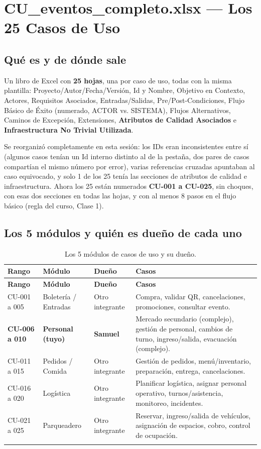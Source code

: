 \documentclass[12pt,a4paper]{article}
\begin{document}
\section{CU\_eventos\_completo.xlsx --- Los 25 Casos de Uso}

\subsection{Qué es y de dónde sale}

Un libro de Excel con \textbf{25 hojas}, una por caso de uso, todas con la misma plantilla:
Proyecto/Autor/Fecha/Versión, Id y Nombre, Objetivo en Contexto, Actores, Requisitos Asociados,
Entradas/Salidas, Pre/Post-Condiciones, Flujo Básico de Éxito (numerado, ACTOR vs. SISTEMA),
Flujos Alternativos, Caminos de Excepción, Extensiones, \textbf{Atributos de Calidad Asociados} e
\textbf{Infraestructura No Trivial Utilizada}.

Se reorganizó completamente en esta sesión: los IDs eran inconsistentes entre sí (algunos casos
tenían un Id interno distinto al de la pestaña, dos pares de casos compartían el mismo número por
error), varias referencias cruzadas apuntaban al caso equivocado, y solo 1 de los 25 tenía las
secciones de atributos de calidad e infraestructura. Ahora los 25 están numerados
\textbf{CU-001 a CU-025}, sin choques, con esas dos secciones en todas las hojas, y con al menos 8
pasos en el flujo básico (regla del curso, Clase 1).

\subsection{Los 5 módulos y quién es dueño de cada uno}

\begin{longtable}{p{1.7cm}p{4.2cm}p{2.6cm}p{4.4cm}}
\toprule
\textbf{Rango} & \textbf{Módulo} & \textbf{Dueño} & \textbf{Casos}\\
\midrule
\endfirsthead
\toprule
\textbf{Rango} & \textbf{Módulo} & \textbf{Dueño} & \textbf{Casos}\\
\midrule
\endhead
CU-001 a 005 & Boletería / Entradas & Otro integrante & Compra, validar QR, cancelaciones,
promociones, consultar evento.\\[0.3em]
\textbf{CU-006 a 010} & \textbf{Personal (tuyo)} & \textbf{Samuel} & Mercado secundario (complejo),
gestión de personal, cambios de turno, ingreso/salida, evacuación (complejo).\\[0.3em]
CU-011 a 015 & Pedidos / Comida & Otro integrante & Gestión de pedidos, menú/inventario,
preparación, entrega, cancelaciones.\\[0.3em]
CU-016 a 020 & Logística & Otro integrante & Planificar logística, asignar personal operativo,
turnos/asistencia, monitoreo, incidentes.\\[0.3em]
CU-021 a 025 & Parqueadero & Otro integrante & Reservar, ingreso/salida de vehículos, asignación de
espacios, cobro, control de ocupación.\\
\bottomrule
\caption{Los 5 módulos de casos de uso y su dueño.}
\end{longtable}
\end{document}
